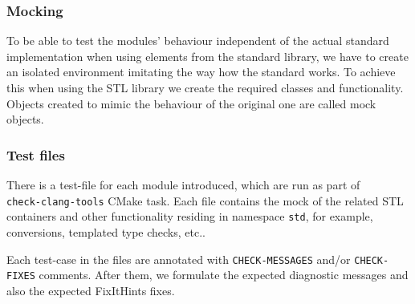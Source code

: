 \subsubsection{Mocking}
\par To be able to test the modules' behaviour independent of the actual standard implementation when using elements from the standard library, we have to create an isolated environment imitating the way how the standard works. To achieve this when using the STL library we create the required classes and functionality. Objects created to mimic the behaviour of the original one are called mock objects.
\subsubsection{Test files}
\par There is a test-file for each module introduced, which are run as part of \\\verb|check-clang-tools| CMake task. Each file contains the mock of the related STL containers and other functionality residing in namespace \verb|std|, for example, conversions, templated type checks, etc.. \medskip
\par Each test-case in the files are annotated with \verb|CHECK-MESSAGES| and/or \verb|CHECK-FIXES| comments. After them, we formulate the expected diagnostic messages and also the expected FixItHints fixes.
